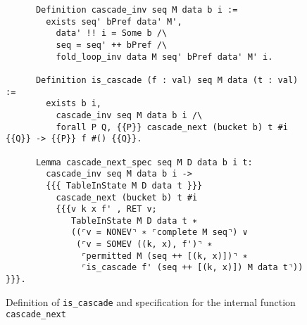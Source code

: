 \documentclass[10pt,a4paper]{article}
\begin{document}
\begin{figure}
\begin{verbatim}
      Definition cascade_inv seq M data b i :=
        exists seq' bPref data' M',
          data' !! i = Some b /\
          seq = seq' ++ bPref /\
          fold_loop_inv data M seq' bPref data' M' i.
                        
      Definition is_cascade (f : val) seq M data (t : val) :=
        exists b i,
          cascade_inv seq M data b i /\
          forall P Q, {{P}} cascade_next (bucket b) t #i {{Q}} -> {{P}} f #() {{Q}}.

      Lemma cascade_next_spec seq M D data b i t:
        cascade_inv seq M data b i ->
        {{{ TableInState M D data t }}}
          cascade_next (bucket b) t #i
          {{{v k x f' , RET v;
             TableInState M D data t ∗
             ((⌜v = NONEV⌝ ∗ ⌜complete M seq⌝) ∨
              (⌜v = SOMEV ((k, x), f')⌝ ∗
               ⌜permitted M (seq ++ [(k, x)])⌝ ∗           
               ⌜is_cascade f' (seq ++ [(k, x)]) M data t⌝)) }}}.
\end{verbatim}
\caption{Definition of \texttt{is\_cascade} and specification for the internal function \texttt{cascade\_next}}
\label{fig:is_cascade}
\end{figure}


\printbibliography
\end{document}
